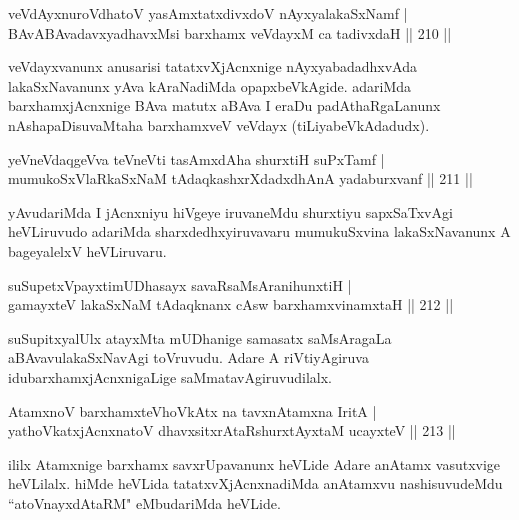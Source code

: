 \begin{shl}
veVdAyxnuroVdhatoV yasAmxtatxdivxdoV nAyxyalakaSxNamf |\\
BAvABAvadavxyadhavxMsi barxhamx veVdayxM ca tadivxdaH \hfill || 210 ||
\end{shl}

\begin{artha}
veVdayxvanunx anusarisi tatatxvXjAcnxnige nAyxyabadadhxvAda lakaSxNavanunx yAva kAraNadiMda opapxbeVkAgide. adariMda barxhamxjAcnxnige BAva matutx aBAva I eraDu padAthaRgaLanunx nAshapaDisuvaMtaha barxhamxveV veVdayx (tiLiyabeVkAdadudx).
\end{artha}

\begin{shl}
yeVneVdaqgeVva teVneVti tasAmxdAha shurxtiH suPxTamf |\\
mumukoSxVlaRkaSxNaM tAdaqkashxrXdadxdhAnA yadaburxvanf \hfill || 211 ||
\end{shl}

\begin{artha}
yAvudariMda I jAcnxniyu hiVgeye iruvaneMdu shurxtiyu sapxSaTxvAgi heVLiruvudo adariMda sharxdedhxyiruvavaru mumukuSxvina lakaSxNavanunx A bageyalelxV heVLiruvaru.
\end{artha}%


\begin{shl}
suSupetxV\s payxtimUDhasayx savaRsaMsAranihunxtiH |\\
gamayxteV lakaSxNaM tAdaqknanx cAsw barxhamxvinamxtaH \hfill || 212 ||
\end{shl}

\begin{artha}
suSupitxyalUlx atayxMta mUDhanige samasatx saMsAragaLa aBAvavu\break lakaSxNavAgi toVruvudu. Adare A riVtiyAgiruva idu\break barxhamxjAcnxnigaLige saMmatavAgiruvudilalx.
\end{artha}


\begin{shl}
AtamxnoV barxhamxteVhoVkAtx na tavxnAtamxna IritA |\\
yathoVkatxjAcnxnatoV dhavxsitxrAtaRshurxtAyx\s taM ucayxteV \hfill || 213 ||
\end{shl}

\begin{artha}
ililx Atamxnige barxhamx savxrUpavanunx heVLide Adare anAtamx vasutxvige heVLilalx. hiMde heVLida tatatxvXjAcnxnadiMda anAtamxvu nashisuvudeMdu ``atoV\s nayxdAtaRM" eMbudariMda heVLide.
\end{artha}

